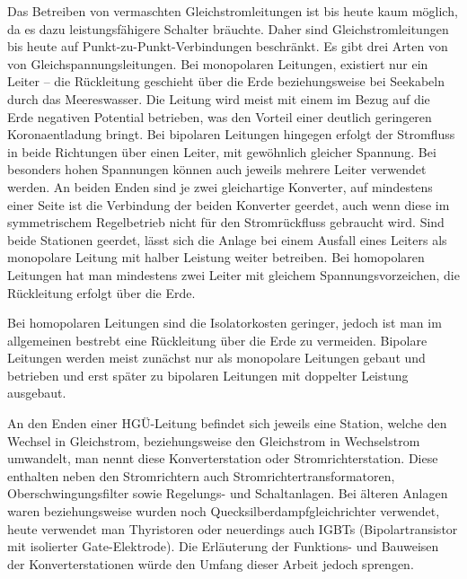 Das Betreiben von vermaschten Gleichstromleitungen ist bis heute kaum möglich, da es dazu leistungsfähigere Schalter bräuchte.\cite{Schymroch}
Daher sind Gleichstromleitungen bis heute auf Punkt-zu-Punkt-Verbindungen beschränkt.
Es gibt drei Arten von von Gleichspannungsleitungen.
Bei monopolaren Leitungen, existiert nur ein Leiter – die Rückleitung geschieht über die Erde beziehungsweise bei Seekabeln durch das Meereswasser. Die Leitung wird meist mit einem im Bezug auf die Erde negativen Potential betrieben, was den Vorteil einer deutlich geringeren Koronaentladung bringt.\cite{Padiyar}
Bei bipolaren Leitungen hingegen erfolgt der Stromfluss in beide Richtungen über einen Leiter, mit gewöhnlich gleicher Spannung. Bei besonders hohen Spannungen können auch jeweils mehrere Leiter verwendet werden. An beiden Enden sind je zwei gleichartige Konverter, auf mindestens einer Seite ist die Verbindung der beiden Konverter geerdet, auch wenn diese im symmetrischem Regelbetrieb nicht für den Stromrückfluss gebraucht wird. Sind beide Stationen geerdet, lässt sich die Anlage bei einem Ausfall eines Leiters als monopolare Leitung mit halber Leistung weiter betreiben.
Bei homopolaren Leitungen hat man mindestens zwei Leiter mit gleichem Spannungsvorzeichen, die Rückleitung erfolgt über die Erde.

Bei homopolaren Leitungen sind die Isolatorkosten geringer, jedoch ist man im allgemeinen bestrebt eine Rückleitung über die Erde zu vermeiden. Bipolare Leitungen werden meist zunächst nur als monopolare Leitungen gebaut und betrieben und erst später zu bipolaren Leitungen mit doppelter Leistung ausgebaut.\cite{Padiyar}

An den Enden einer HGÜ-Leitung befindet sich jeweils eine Station, welche den Wechsel in Gleichstrom, beziehungsweise den Gleichstrom in Wechselstrom umwandelt, man nennt diese Konverterstation oder Stromrichterstation. Diese enthalten neben den Stromrichtern auch Stromrichtertransformatoren, Oberschwingungsfilter sowie Regelungs- und Schaltanlagen. Bei älteren Anlagen waren beziehungsweise wurden noch Quecksilberdampfgleichrichter verwendet, heute verwendet man Thyristoren oder neuerdings auch IGBTs (Bipolartransistor mit isolierter Gate-Elektrode). Die Erläuterung der Funktions- und Bauweisen der Konverterstationen würde den Umfang dieser Arbeit jedoch sprengen.


